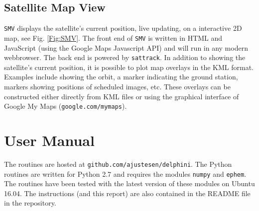 \documentclass[10pt,a4paper]{article}
\begin{document}
\subsection{Satellite Map View}
\texttt{SMV} displays the satellite's current position, live updating, on a interactive 2D map, see Fig. \ref{Fig:SMV}. The front end of \texttt{SMV} is written in HTML and JavaScript (using the Google Maps Javascript API) and will run in any modern webbrowser. The back end is powered by \texttt{sattrack}. In addition to showing the satellite's current position, it is possible to plot map overlays in the KML format. Examples include showing the orbit, a marker indicating the ground station, markers showing positions of scheduled images, etc. These overlays can be constructed either directly from KML files or using the graphical interface of Google My Maps (\texttt{google.com/mymaps}). 



\section{User Manual}
The routines are hosted at \texttt{github.com/ajustesen/delphini}. The Python routines are written for Python 2.7 and requires the modules \texttt{numpy} and \texttt{ephem}. The routines have been tested with the latest version of these modules on Ubuntu 16.04. The instructions (and this report) are also contained in the README file in the repository.
\end{document}
